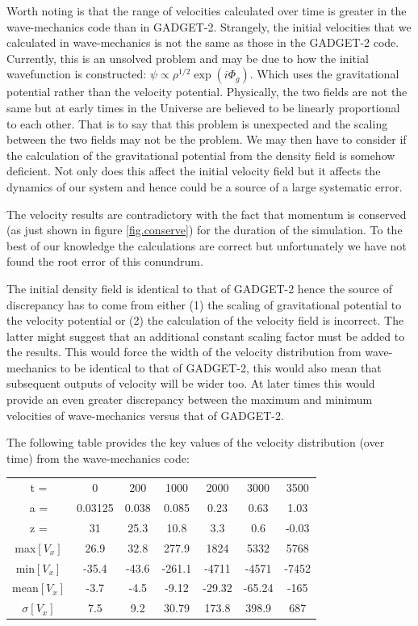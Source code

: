 Worth noting is that the range of velocities calculated over time is greater in the wave-mechanics code than in GADGET-2. Strangely, the initial velocities that we calculated in wave-mechanics is not the same as those in the GADGET-2 code. Currently, this is an unsolved problem and may be due to how the initial wavefunction is constructed: $\psi \propto \rho^{1/2} \exp(i\Phi_g)$. Which uses the gravitational potential rather than the velocity potential. Physically, the two fields are not the same but at early times in the Universe are believed to be linearly proportional to each other. That is to say that this problem is unexpected and the scaling between the two fields may not be the problem. We may then have to consider if the calculation of the gravitational potential from the density field is somehow deficient. Not only does this affect the initial velocity field but it affects the dynamics of our system and hence could be a source of a large systematic error.

The velocity results are contradictory with the fact that momentum is conserved (as just shown in figure \ref{fig.conserve}) for the duration of the simulation. To the best of our knowledge the calculations are correct but unfortunately we have not found the root error of this conundrum.

The initial density field is identical to that of GADGET-2 hence the source of discrepancy has to come from either (1) the scaling of gravitational potential to the velocity potential or (2) the calculation of the velocity field is incorrect. The latter might suggest that an additional constant scaling factor must be added to the results. This would force the width of the velocity distribution from wave-mechanics to be identical to that of GADGET-2, this would also mean that subsequent outputs of velocity will be wider too. At later times this would provide an even greater discrepancy between the maximum and minimum velocities of wave-mechanics versus that of GADGET-2.


The following table provides the key values of the velocity distribution (over time) from the wave-mechanics code:

\vspace*{1cm}
\begin{center}
\begin{tabular}{|c|c|c|c|c|c|c|}
  \hline
  t = & 0 & 200 & 1000 & 2000 & 3000 & 3500 \\
  a = & 0.03125 & 0.038 & 0.085 & 0.23 & 0.63 & 1.03 \\
  z = & 31 & 25.3 & 10.8 & 3.3 & 0.6 & -0.03 \\  \hline
  max$[V_x]$ & 26.9 & 32.8& 277.9& 1824& 5332& 5768 \\
  min$[V_x]$ & -35.4&-43.6&-261.1&-4711&-4571& -7452 \\
  mean$[V_x]$ & -3.7&-4.5 &-9.12 &-29.32&-65.24&-165  \\
  $\sigma[V_x]$ & 7.5&9.2 &30.79 &173.8& 398.9& 687 \\
  \hline
\end{tabular}
\end{center}
\vspace*{1cm}

